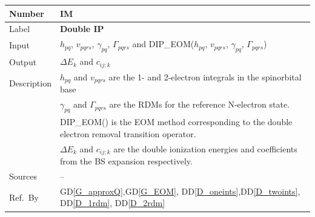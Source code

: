 \documentclass[12pt]{article}
\newcommand{\colAwidth}{0.13\textwidth}
\newcommand{\colBwidth}{0.82\textwidth}
\newcommand{\dref}[1]{GD\ref{#1}}
\newcommand{\ddref}[1]{DD\ref{#1}}
\newcounter{instnum} %
\begin{document}
\noindent
\begin{minipage}{\textwidth}
	\renewcommand*{\arraystretch}{1.5}
	\begin{tabular}{| p{\colAwidth} | p{\colBwidth}|}
		\hline
		\rowcolor[gray]{0.9}
		Number& IM{instnum}\theinstnum \label{IM_DIP}\\
		\hline
		Label& \bf Double IP\\
		\hline
		Input&$h_{pq}$, $v_{pqrs}$, $\gamma_{pq}$, $\Gamma_{pqrs}$ and 
		DIP\_EOM($h_{pq}$, $v_{pqrs}$, $\gamma_{pq}$, $\Gamma_{pqrs}$)\\
		\hline
		Output&$\Delta E_k$ and $c_{ij;k}$\\
		\hline
		Description& $h_{pq} $ and $ v_{pqrs}$ are the 1- and 2-electron 
		integrals in the spinorbital base\\
		& $\gamma_{pq}$ and $\Gamma_{pqrs}$ are the RDMs for the reference 
		N-electron state.\\
		& DIP\_EOM() is the EOM method corresponding to the double electron 
		removal transition operator.\\
		&$\Delta E_k$ and $c_{ij;k}$ are the double ionization energies and 
		coefficients from the BS expansion respectively.\\
		\hline
		Sources& -- \\
		\hline
		Ref.\ By & \dref{G_approxQ},\dref{G_EOM},  
		\ddref{D_oneints},\ddref{D_twoints}, \ddref{D_1rdm}, 
		\ddref{D_2rdm}\\
		\hline
	\end{tabular}
\end{minipage}\\

~\newline
\end{document}
